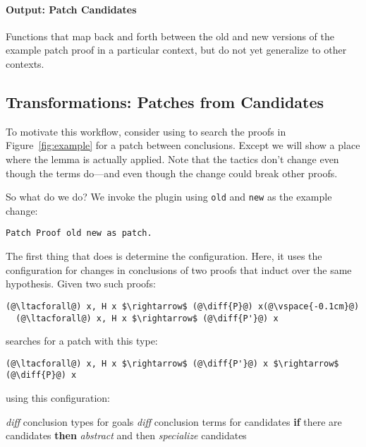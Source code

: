 \paragraph{Output: Patch Candidates}
Functions that map back and forth between the old and new versions
of the example patch proof in a particular context, but do not yet generalize to other contexts.
\fi

\subsection{Transformations: Patches from Candidates}
\label{sec:pumpkin-spec-trans}





To motivate this workflow, consider using \sysname to search the proofs in
Figure~\ref{fig:example} for a patch between conclusions.
Except we will show a place where the lemma is actually applied.
Note that the tactics don't change even though the terms do---and even though the change could break other proofs.

So what do we do?
We invoke the plugin using \lstinline{old} and \lstinline{new} as the example change:

\begin{lstlisting}[language=ml4]
  Patch Proof old new as patch.
\end{lstlisting}

The first thing that \sysname does is determine the configuration.
Here, it uses the configuration for changes in conclusions of two proofs
that induct over the same hypothesis. Given two such
proofs:

\begin{lstlisting}[language=coq]
  (@\ltacforall@) x, H x $\rightarrow$ (@\diff{P}@) x(@\vspace{-0.1cm}@)
  (@\ltacforall@) x, H x $\rightarrow$ (@\diff{P'}@) x
\end{lstlisting}
\sysname searches for a patch with this type:

\begin{lstlisting}[language=coq]
  (@\ltacforall@) x, H x $\rightarrow$ (@\diff{P'}@) x $\rightarrow$ (@\diff{P}@) x
\end{lstlisting}
using this configuration:

\begin{algorithm}
\footnotesize
\begin{algorithmic}[1]
    \STATE \textit{diff} conclusion types for goals
    \STATE \textit{diff} conclusion terms for candidates
    \STATE \textbf{if} there are candidates \textbf{then}
    \STATE \hspace*{1em} \textit{abstract} and then \textit{specialize} candidates
\end{algorithmic}
\end{algorithm}

